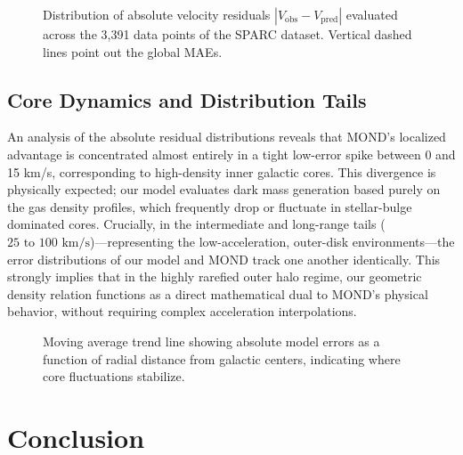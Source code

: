 \documentclass[twocolumn]{aastex631}
\begin{document}
\begin{figure}[ht!]
\centering
\label{fig:histogram}
\begin{center}
\end{center}
\caption{Distribution of absolute velocity residuals $|V_{\text{obs}} - V_{\text{pred}}|$ evaluated across the 3,391 data points of the SPARC dataset. Vertical dashed lines point out the global MAEs.}
\end{figure}

\subsection{Core Dynamics and Distribution Tails}
An analysis of the absolute residual distributions reveals that MOND’s localized advantage is concentrated almost entirely in a tight low-error spike between 0 and 15 km/s, corresponding to high-density inner galactic cores. This divergence is physically expected; our model evaluates dark mass generation based purely on the gas density profiles, which frequently drop or fluctuate in stellar-bulge dominated cores. Crucially, in the intermediate and long-range tails ($25\text{ to }100\text{ km/s}$)---representing the low-acceleration, outer-disk environments---the error distributions of our model and MOND track one another identically. This strongly implies that in the highly rarefied outer halo regime, our geometric density relation functions as a direct mathematical dual to MOND's physical behavior, without requiring complex acceleration interpolations.

\begin{figure}[ht!]
\centering
\label{fig:radial_error}
\begin{center}
\end{center}
\caption{Moving average trend line showing absolute model errors as a function of radial distance from galactic centers, indicating where core fluctuations stabilize.}
\end{figure}

\section{Conclusion} \label{sec:conclusion}
\end{document}

